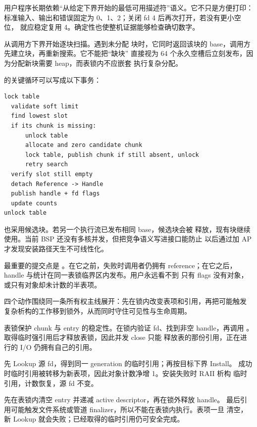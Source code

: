 用户程序长期依赖“从给定下界开始的最低可用描述符”语义。它不只是方便打印：
标准输入、输出和错误固定为 0、1、2；关闭 fd 4 后再次打开，若没有更小空位，
就应稳定复用 4。确定性也使整机证据能够检查确切数字。

 从调用方下界开始逐块扫描。遇到未分配
块时，它同时返回该块的 base，调用方先建立块，再重新搜索。它不能把“缺块”
直接视为 64 个永久空槽后立刻发布，因为分配新块需要 heap，而表锁内不应嵌套
执行复杂分配。

 的关键循环可以写成以下事务：

\begin{lstlisting}[caption={FileTable 安装的两阶段提交}]
lock table
  validate soft limit
  find lowest slot
  if its chunk is missing:
      unlock table
      allocate and zero candidate chunk
      lock table, publish chunk if still absent, unlock
      retry search
  verify slot still empty
  detach Reference -> Handle
  publish handle + fd flags
  update counts
unlock table
\end{lstlisting}

 也采用候选块。若另一个执行流已发布相同 base，候选块会被
释放，现有块继续使用。当前 BSP 还没有多核并发，但把竞争语义写进接口能防止
以后通过加 AP 才发现安装路径天生不可线性化。

最重要的提交点是 。在它之前，失败时调用者仍拥有
reference；在它之后，handle 与统计在同一表锁临界区内发布。用户永远看不到
只有 flags 没有对象，或只有对象却未计数的半表项。

四个动作围绕同一条所有权主线展开：先在锁内改变表项和引用，再把可能触发
复杂析构的工作移到锁外，从而同时守住可见性与生命周期。


表锁保护 chunk 与 entry 的稳定性。在锁内验证 fd、找到非空 handle，再调用
。取得临时强引用后才释放表锁，因此并发 close 只能
释放表的那份引用，正在进行的 I/O 仍拥有自己的引用。


先 Lookup 源 fd，得到同一 generation 的临时引用；再按目标下界 Install。
成功时临时引用被转移为新表项，因此对象计数净增 1。安装失败时 RAII 析构
临时引用，计数恢复，源 fd 不变。


先在表锁内清空 entry 并递减 active descriptor，再在锁外释放 handle。
最后引用可能触发文件系统或管道 finalizer，所以不能在表锁内执行。表项一旦
清空，新 Lookup 就会失败；已经取得的临时引用仍可安全完成。

